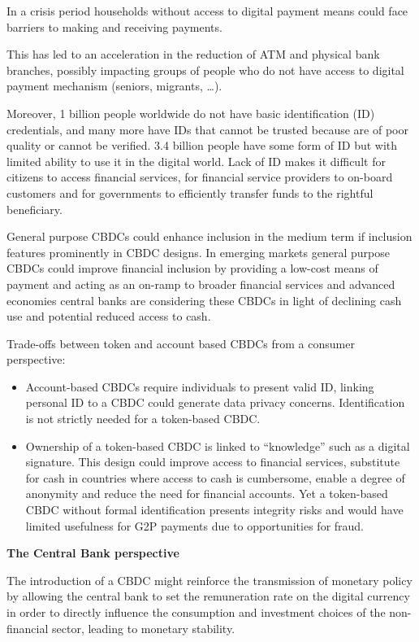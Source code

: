 In a crisis period households without access to digital payment means could face barriers to making and receiving payments.

This has led to an acceleration in the reduction of ATM and physical bank branches, possibly impacting groups of people who do not have access to digital payment mechanism (seniors, migrants, \ldots).

Moreover, 1 billion people worldwide do not have basic identification (ID) credentials, and many more have IDs that cannot be trusted because are of poor quality or cannot be verified.
3.4 billion people have some form of ID but with limited ability to use it in the digital world.
Lack of ID makes it difficult for citizens to access financial services, for financial service providers to on-board customers and for governments to efficiently transfer funds to the rightful beneficiary.

General purpose CBDCs could enhance inclusion in the medium term if inclusion features prominently in CBDC designs.
In emerging markets general purpose CBDCs could improve financial inclusion by providing a low-cost means of payment and acting as an on-ramp to broader financial services and advanced economies central banks are considering these CBDCs in light of declining cash use and potential reduced access to cash.

Trade-offs between token and account based CBDCs from a consumer perspective:
\begin{itemize}
    \item Account-based CBDCs require individuals to present valid ID, linking personal ID to a CBDC could generate data privacy concerns. Identification is not strictly needed for a token-based CBDC.
    \item Ownership of a token-based CBDC is linked to “knowledge” such as a digital signature. This design could improve access to financial services, substitute for cash in countries where access to cash is cumbersome, enable a degree of anonymity and reduce the need for financial accounts. Yet a token-based CBDC without formal identification presents integrity risks and would have limited usefulness for G2P payments due to opportunities for fraud.
\end{itemize}

\textbf{The Central Bank perspective}

The introduction of a CBDC might reinforce the transmission of monetary policy by allowing the central bank to set the remuneration rate on the digital currency in order to directly influence the consumption and investment choices of the non-financial sector, leading to monetary stability.

